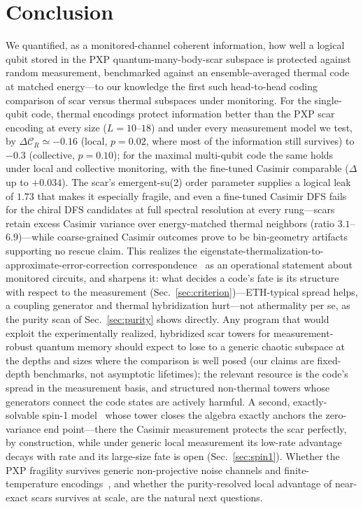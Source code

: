 \documentclass[aps,prb,twocolumn]{revtex4-2}
\newcommand{\CR}{\mathcal{C}_R}
\begin{document}
\section{Conclusion}

We quantified, as a monitored-channel coherent information, how well a logical
qubit stored in the PXP quantum-many-body-scar subspace is protected against
random measurement, benchmarked against an ensemble-averaged thermal code at
matched energy---to our knowledge the first such head-to-head coding comparison
of scar versus thermal subspaces under monitoring.
For the single-qubit code, thermal encodings protect information better than
the PXP scar encoding at every size ($L=10$--$18$) and under every measurement
model we test, by $\Delta\CR\simeq-0.16$ (local, $p=0.02$, where most of the
information still survives) to $-0.3$ (collective, $p=0.10$); for the maximal
multi-qubit code the same holds under local and collective monitoring, with
the fine-tuned Casimir comparable ($\Delta$ up to $+0.034$). The scar's
emergent-su(2) order parameter supplies a logical leak of $1.73$ that makes it
especially fragile, and even a fine-tuned Casimir DFS
fails for the chiral DFS candidates at full spectral resolution at every
rung---scars retain excess Casimir variance over energy-matched thermal
neighbors (ratio $3.1$--$6.9$)---while coarse-grained Casimir outcomes
prove to be bin-geometry artifacts supporting no rescue claim.
This realizes the eigenstate-thermalization-to-approximate-error-correction
correspondence~\cite{Brandao2019,BaoCheng2019,Qasim2025} as an operational statement about monitored
circuits, and sharpens it: what decides a code's fate is its structure with
respect to the measurement (Sec.~\ref{sec:criterion})---ETH-typical spread
helps, a coupling generator and thermal hybridization hurt---not
athermality per se, as the purity scan of Sec.~\ref{sec:purity} shows
directly.
Any program that would exploit the experimentally realized, hybridized scar
towers for measurement-robust
quantum memory should expect to lose to a generic chaotic subspace at the
depths and sizes where the comparison is well posed (our claims are
fixed-depth benchmarks, not asymptotic lifetimes); the relevant
resource is the code's spread in the measurement basis, and structured
non-thermal towers whose generators connect the code states are actively
harmful.
A second, exactly-solvable spin-1 model~\cite{Schecter2019} whose tower closes
the algebra exactly anchors the zero-variance end point---there the
Casimir measurement protects the scar perfectly, by construction, while under
generic local measurement its low-rate advantage decays with rate and its
large-size fate is open (Sec.~\ref{sec:spin1}). Whether the PXP fragility
survives generic non-projective
noise channels and finite-temperature encodings~\cite{Moudgalya2018,Moudgalya2022},
and whether the purity-resolved local advantage of near-exact scars survives
at scale, are the natural next questions.
\end{document}
